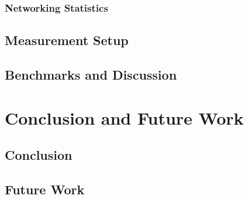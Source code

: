 \subsection{Networking Statistics}
\section{Measurement Setup}
\section{Benchmarks and Discussion}

\chapter{\label{chp:content} Conclusion and Future Work}
\section{Conclusion}
\section{Future Work}

